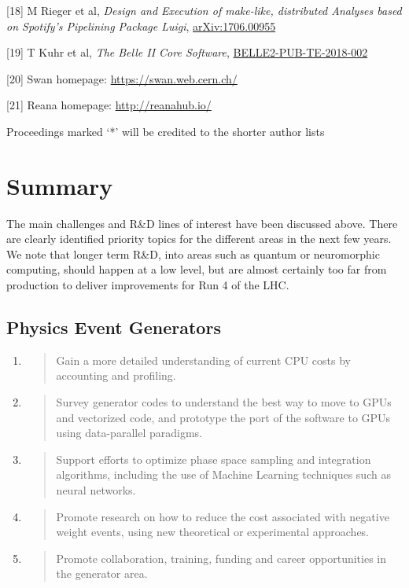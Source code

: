 \documentclass[11pt,a4paper]{article}
\begin{document}
{[}18{]} M Rieger et al, \emph{Design and Execution of make-like,
distributed Analyses based on Spotify's Pipelining Package Luigi},
\href{https://arxiv.org/abs/1706.00955}{{arXiv:1706.00955}}

{[}19{]} T Kuhr et al, \emph{The Belle II Core Software},
\href{https://docs.belle2.org/record/1044}{{BELLE2-PUB-TE-2018-002}}

{[}20{]} Swan homepage:
\href{https://swan.web.cern.ch/}{{https://swan.web.cern.ch/}}

{[}21{]} Reana homepage:
\href{http://reanahub.io/}{{http://reanahub.io/}}

Proceedings marked `*' will be credited to the shorter author lists

\hypertarget{summary}{%
\section{Summary}\label{summary}}

The main challenges and R\&D lines of interest have been discussed
above. There are clearly identified priority topics for the different
areas in the next few years. We note that longer term R\&D, into areas
such as quantum or neuromorphic computing, should happen at a low level,
but are almost certainly too far from production to deliver improvements
for Run 4 of the LHC.

\hypertarget{physics-event-generators-1}{%
\subsection{Physics Event Generators}\label{physics-event-generators-1}}

\begin{enumerate}
\def\labelenumi{\arabic{enumi}.}
\item
  \begin{quote}
  Gain a more detailed understanding of current CPU costs by accounting
  and profiling.
  \end{quote}
\item
  \begin{quote}
  Survey generator codes to understand the best way to move to GPUs and
  vectorized code, and prototype the port of the software to GPUs using
  data-parallel paradigms.
  \end{quote}
\item
  \begin{quote}
  Support efforts to optimize phase space sampling and integration
  algorithms, including the use of Machine Learning techniques such as
  neural networks.
  \end{quote}
\item
  \begin{quote}
  Promote research on how to reduce the cost associated with negative
  weight events, using new theoretical or experimental approaches.
  \end{quote}
\item
  \begin{quote}
  Promote collaboration, training, funding and career opportunities in
  the generator area.
  \end{quote}
\end{enumerate}
\end{document}
